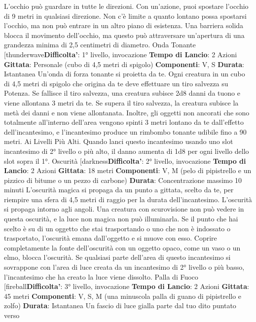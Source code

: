 \begin{multicols}{2}
L’occhio può guardare in tutte le direzioni.
Con un’azione, puoi spostare l’occhio di 9 metri in
qualsiasi direzione. Non c’è limite a quanto lontano
possa spostarsi l’occhio, ma non può entrare in un altro
piano di esistenza. Una barriera solida blocca il
movimento dell’occhio, ma questo può attraversare
un’apertura di una grandezza minima di 2,5 centimetri
di diametro.
Onda Tonante
[thunderwave\textbf{Difficolta'}:
1° livello, invocazione
\textbf{Tempo di Lancio}: 2 Azioni
\textbf{Gittata}: Personale (cubo di 4,5 metri di spigolo)
\textbf{Componenti}: V, S
\textbf{Durata}: Istantanea
Un’onda di forza tonante si proietta da te. Ogni creatura
in un cubo di 4,5 metri di spigolo che origina da te deve
effettuare un tiro salvezza su Potenza. Se fallisce il
tiro salvezza, una creatura subisce 2d8 danni da tuono
e viene allontana 3 metri da te. Se supera il tiro
salvezza, la creatura subisce la metà dei danni e non
viene allontanata.
Inoltre, gli oggetti non ancorati che sono totalmente
all’interno dell’area vengono spinti 3 metri lontano da te
dall’effetto dell’incantesimo, e l’incantesimo produce un
rimbombo tonante udibile fino a 90 metri.
Ai Livelli Più Alti. Quando lanci questo incantesimo
usando uno slot incantesimo di 2° livello o più alto, il
danno aumenta di 1d8 per ogni livello dello slot sopra il
1°.
Oscurità
[darkness\textbf{Difficolta'}:
2° livello, invocazione
\textbf{Tempo di Lancio}: 2 Azioni
\textbf{Gittata}: 18 metri
\textbf{Componenti}: V, M (pelo di pipistrello e un pizzico di
bitume o un pezzo di carbone)
\textbf{Durata}: Concentrazione massimo 10 minuti
L’oscurità magica si propaga da un punto a gittata,
scelto da te, per riempire una sfera di 4,5 metri di raggio
per la durata dell’incantesimo. L’oscurità si propaga
intorno agli angoli. Una creatura con scurovisione non
può vedere in questa oscurità, e la luce non magica non
può illuminarla.
Se il punto che hai scelto è su di un oggetto che stai
trasportando o uno che non è indossato o trasportato,
l’oscurità emana dall’oggetto e si muove con esso.
Coprire completamente la fonte dell’oscurità con un
oggetto opaco, come un vaso o un elmo, blocca
l’oscurità.
Se qualsiasi parte dell’area di questo incantesimo si
sovrappone con l’area di luce creata da un incantesimo
di 2° livello o più basso, l’incantesimo che ha creato la
luce viene dissolto.
Palla di Fuoco
[fireball\textbf{Difficolta'}:
3° livello, invocazione
\textbf{Tempo di Lancio}: 2 Azioni
\textbf{Gittata}: 45 metri
\textbf{Componenti}: V, S, M (una minuscola palla di guano di
pipistrello e zolfo)
\textbf{Durata}: Istantanea
Un fascio di luce gialla parte dal tuo dito puntato verso

\end{multicols}
